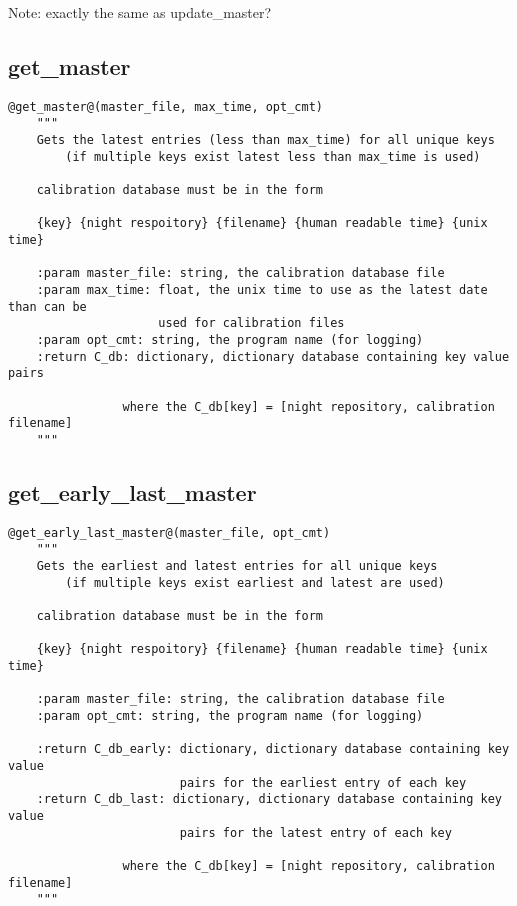 \noindent Note: exactly the same as update\_master? \\

\subsection{get\_master}
\begin{lstlisting}[style=pythonstyle]
@get_master@(master_file, max_time, opt_cmt)
    """
    Gets the latest entries (less than max_time) for all unique keys 
        (if multiple keys exist latest less than max_time is used)
        
    calibration database must be in the form
    
    {key} {night respoitory} {filename} {human readable time} {unix time}
    
    :param master_file: string, the calibration database file
    :param max_time: float, the unix time to use as the latest date than can be
                     used for calibration files
    :param opt_cmt: string, the program name (for logging)
    :return C_db: dictionary, dictionary database containing key value pairs
        
                where the C_db[key] = [night repository, calibration filename]
    """
\end{lstlisting}

\vspace{0.5cm}
\subsection{get\_early\_last\_master}
\begin{lstlisting}[style=pythonstyle]
@get_early_last_master@(master_file, opt_cmt)
    """
    Gets the earliest and latest entries for all unique keys
        (if multiple keys exist earliest and latest are used)

    calibration database must be in the form

    {key} {night respoitory} {filename} {human readable time} {unix time}

    :param master_file: string, the calibration database file
    :param opt_cmt: string, the program name (for logging)
    
    :return C_db_early: dictionary, dictionary database containing key value
                        pairs for the earliest entry of each key
    :return C_db_last: dictionary, dictionary database containing key value
                        pairs for the latest entry of each key

                where the C_db[key] = [night repository, calibration filename]
    """
\end{lstlisting}


